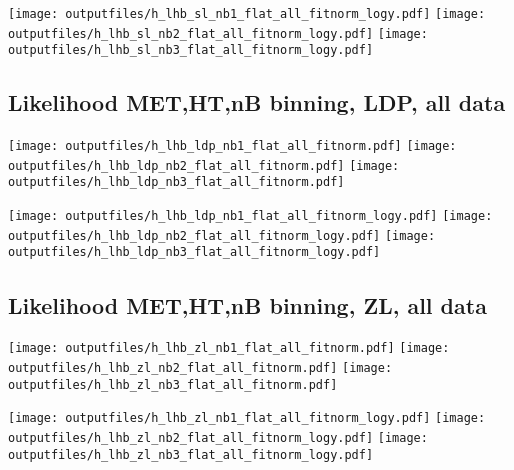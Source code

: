 \documentclass[11pt]{article}
\begin{document}
    \noindent
     \texttt{[image: outputfiles/h\_lhb\_sl\_nb1\_flat\_all\_fitnorm\_logy.pdf]}
     \texttt{[image: outputfiles/h\_lhb\_sl\_nb2\_flat\_all\_fitnorm\_logy.pdf]}
     \texttt{[image: outputfiles/h\_lhb\_sl\_nb3\_flat\_all\_fitnorm\_logy.pdf]}

    \clearpage






    \subsection{ Likelihood MET,HT,nB binning, LDP, all data}

    \noindent
     \texttt{[image: outputfiles/h\_lhb\_ldp\_nb1\_flat\_all\_fitnorm.pdf]}
     \texttt{[image: outputfiles/h\_lhb\_ldp\_nb2\_flat\_all\_fitnorm.pdf]}
     \texttt{[image: outputfiles/h\_lhb\_ldp\_nb3\_flat\_all\_fitnorm.pdf]}

    \noindent
     \texttt{[image: outputfiles/h\_lhb\_ldp\_nb1\_flat\_all\_fitnorm\_logy.pdf]}
     \texttt{[image: outputfiles/h\_lhb\_ldp\_nb2\_flat\_all\_fitnorm\_logy.pdf]}
     \texttt{[image: outputfiles/h\_lhb\_ldp\_nb3\_flat\_all\_fitnorm\_logy.pdf]}

   \clearpage

    \subsection{ Likelihood MET,HT,nB binning, ZL, all data}

    \noindent
     \texttt{[image: outputfiles/h\_lhb\_zl\_nb1\_flat\_all\_fitnorm.pdf]}
     \texttt{[image: outputfiles/h\_lhb\_zl\_nb2\_flat\_all\_fitnorm.pdf]}
     \texttt{[image: outputfiles/h\_lhb\_zl\_nb3\_flat\_all\_fitnorm.pdf]}

    \noindent
     \texttt{[image: outputfiles/h\_lhb\_zl\_nb1\_flat\_all\_fitnorm\_logy.pdf]}
     \texttt{[image: outputfiles/h\_lhb\_zl\_nb2\_flat\_all\_fitnorm\_logy.pdf]}
     \texttt{[image: outputfiles/h\_lhb\_zl\_nb3\_flat\_all\_fitnorm\_logy.pdf]}

   \clearpage
\end{document}
